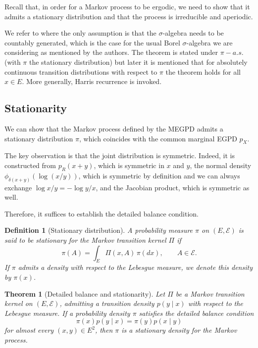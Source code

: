 \documentclass{article}
\newtheorem{definition}{Definition}[section]
\newtheorem{theorem}[theorem]{Theorem}
\begin{document}
Recall that, in order for a Markov process to be ergodic, we need to show that it admits a stationary distribution and that the process is irreducible and aperiodic.

We refer to \textcite[Theorem 4]{roberts2004} where the only assumption is that the $\sigma$-algebra needs to be countably generated, which is the case for the usual Borel $\sigma$-algebra we are considering as mentioned by the authors. The theorem is stated under $\pi-a.s.$ (with $\pi$ the stationary distribution) but later it is mentioned that for absolutely continuous transition distributions with respect to $\pi$ the theorem holds for all $x \in E$. More generally, Harris recurrence is invoked.

\subsection{Stationarity}

We can show that the Markov process defined by the MEGPD admits a stationary distribution $\pi$, which coincides with the common marginal EGPD $p_X$.

The key observation is that the joint distribution is symmetric. Indeed, it is constructed from $p_R(x+y)$, which is symmetric in $x$ and $y$, the normal density $\phi_{\delta(x+y)}(\log(x/y))$, which is symmetric by definition and we can always exchange $\log x/y = - \log y/x$, and the Jacobian product, which is symmetric as well.

Therefore, it suffices to establish the detailed balance condition.

\begin{definition}[Stationary distribution]
  A probability measure $\pi$ on $(E,\mathcal{E})$ is said to be stationary for the Markov transition kernel $\Pi$ if
  \[
    \pi(A) = \int_E \Pi(x,A)\,\pi(dx),
    \qquad A \in \mathcal{E}.
  \]
  If $\pi$ admits a density with respect to the Lebesgue measure, we denote this density by $\pi(x)$.

\end{definition}

\begin{theorem}[Detailed balance and stationarity]
  Let $\Pi$ be a Markov transition kernel on $(E,\mathcal{E})$, admitting a transition density $p(y \mid x)$ with respect to the Lebesgue measure. If a probability density $\pi$ satisfies the detailed balance condition
  \[
    \pi(x)p(y \mid x)
    =
    \pi(y)p(x \mid y)
  \]
  for almost every $(x,y) \in E^2$, then $\pi$ is a stationary density for the Markov process.
\end{theorem}
\end{document}
